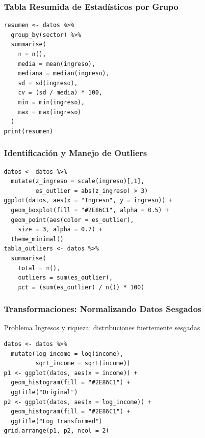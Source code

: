 \documentclass[aspectratio=169,11pt]{beamer}
\begin{document}
\begin{frame}[fragile]
\frametitle{Tabla Resumida de Estadísticos por Grupo}

\begin{lstlisting}[basicstyle=\ttfamily\tiny]
resumen <- datos %>%
  group_by(sector) %>%
  summarise(
    n = n(),
    media = mean(ingreso),
    mediana = median(ingreso),
    sd = sd(ingreso),
    cv = (sd / media) * 100,
    min = min(ingreso),
    max = max(ingreso)
  )
print(resumen)
\end{lstlisting}
\end{frame}

\begin{frame}[fragile]
\frametitle{Identificación y Manejo de Outliers}

\begin{lstlisting}[basicstyle=\ttfamily\tiny]
datos <- datos %>%
  mutate(z_ingreso = scale(ingreso)[,1],
         es_outlier = abs(z_ingreso) > 3)
ggplot(datos, aes(x = "Ingreso", y = ingreso)) +
  geom_boxplot(fill = "#2E86C1", alpha = 0.5) +
  geom_point(aes(color = es_outlier),
    size = 3, alpha = 0.7) +
  theme_minimal()
tabla_outliers <- datos %>%
  summarise(
    total = n(),
    outliers = sum(es_outlier),
    pct = (sum(es_outlier) / n()) * 100)
\end{lstlisting}
\end{frame}

\begin{frame}[fragile]
\frametitle{Transformaciones: Normalizando Datos Sesgados}
\small

\begin{exampleblock}{Problema}
  Ingresos y riqueza: distribuciones fuertemente sesgadas
\end{exampleblock}

\begin{lstlisting}[basicstyle=\ttfamily\tiny]
datos <- datos %>%
  mutate(log_income = log(income),
         sqrt_income = sqrt(income))
p1 <- ggplot(datos, aes(x = income)) +
  geom_histogram(fill = "#2E86C1") +
  ggtitle("Original")
p2 <- ggplot(datos, aes(x = log_income)) +
  geom_histogram(fill = "#2E86C1") +
  ggtitle("Log Transformed")
grid.arrange(p1, p2, ncol = 2)
\end{lstlisting}
\end{frame}
\end{document}

